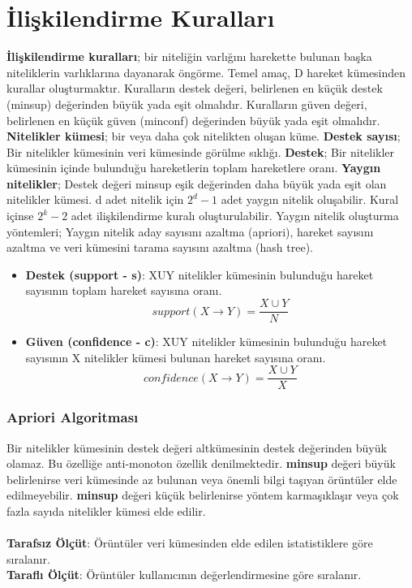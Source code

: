 \section{İlişkilendirme Kuralları}
\textbf{İlişkilendirme kuralları}; bir niteliğin varlığını harekette bulunan başka niteliklerin varlıklarına dayanarak öngörme. Temel amaç, D hareket kümesinden kurallar oluşturmaktır. Kuralların destek değeri, belirlenen en küçük destek (minsup) değerinden büyük yada eşit olmalıdır. Kuralların güven değeri, belirlenen en küçük güven (minconf) değerinden büyük yada eşit olmalıdır. \textbf{Nitelikler kümesi}; bir veya daha çok nitelikten oluşan küme. \textbf{Destek sayısı}; Bir nitelikler kümesinin veri kümesinde görülme sıklığı. \textbf{Destek}; Bir nitelikler kümesinin içinde bulunduğu hareketlerin toplam hareketlere oranı. \textbf{Yaygın nitelikler}; Destek değeri minsup eşik değerinden daha büyük yada eşit olan nitelikler kümesi. d adet nitelik için $2^d-1$ adet yaygın nitelik oluşabilir. Kural içinse $2^k-2$ adet ilişkilendirme kuralı oluşturulabilir. Yaygın nitelik oluşturma yöntemleri; Yaygın nitelik aday sayısını azaltma (apriori), hareket sayısını azaltma ve veri kümesini tarama sayısını azaltma (hash tree).

\begin{itemize}
    \item \textbf{Destek (support - s)}: XUY nitelikler kümesinin bulunduğu hareket sayısının toplam hareket sayısına oranı. \\ \[support(X \rightarrow Y) = \frac{X \cup Y}{N} \]
    \item \textbf{Güven (confidence - c)}: XUY nitelikler kümesinin bulunduğu hareket sayısının X nitelikler kümesi bulunan hareket sayısına oranı. \\ \[confidence(X \rightarrow Y) = \frac{X \cup Y}{X} \]
\end{itemize}

\newpage

\subsubsection{Apriori Algoritması}
Bir nitelikler kümesinin destek değeri altkümesinin destek değerinden büyük olamaz. Bu özelliğe anti-monoton özellik denilmektedir. \textbf{minsup} değeri büyük belirlenirse veri kümesinde az bulunan veya önemli bilgi taşıyan örüntüler elde edilmeyebilir. \textbf{minsup} değeri küçük belirlenirse yöntem karmaşıklaşır veya çok fazla sayıda nitelikler kümesi elde edilir. \\ \\
\textbf{Tarafsız Ölçüt}: Örüntüler veri kümesinden elde edilen istatistiklere göre sıralanır. \\
\textbf{Taraflı Ölçüt}: Örüntüler kullanıcının değerlendirmesine göre sıralanır. \\

